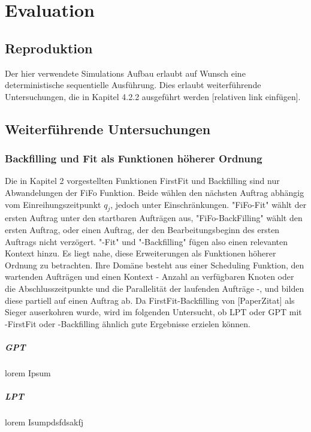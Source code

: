 \chapter{Evaluation}
\label{chap:ein}

\section{Reproduktion}

Der hier verwendete Simulations Aufbau erlaubt auf Wunsch eine deterministische sequentielle Ausführung. Dies erlaubt weiterführende Untersuchungen, die in Kapitel 4.2.2 ausgeführt werden [relativen link einfügen].

\section{Weiterführende Untersuchungen}

\subsection{Backfilling und Fit als Funktionen höherer Ordnung}

Die in Kapitel 2 vorgestellten Funktionen FirstFit und Backfilling sind nur Abwandelungen der FiFo Funktion. Beide wählen den nächsten Auftrag abhängig vom Einreihungszeitpunkt $q_j$, jedoch unter Einschränkungen. "FiFo-Fit" wählt der ersten Auftrag unter den startbaren Aufträgen aus, "FiFo-BackFilling" wählt den ersten Auftrag, oder einen Auftrag, der den Bearbeitungsbeginn des ersten Auftrags nicht verzögert. "-Fit" und "-Backfilling" fügen also einen relevanten Kontext hinzu. Es liegt nahe, diese Erweiterungen als Funktionen höherer Ordnung zu betrachten. Ihre Domäne besteht aus einer Scheduling Funktion, den wartenden Aufträgen und einen Kontext - Anzahl an verfügbaren Knoten oder die Abschlusszeitpunkte und die Parallelität der laufenden Aufträge -, und bilden diese partiell auf einen Auftrag ab. 
Da FirstFit-Backfilling von [PaperZitat] als Sieger auserkohren wurde, wird im folgenden Untersucht, ob LPT oder GPT mit -FirstFit oder -Backfilling ähnlich gute Ergebnisse erzielen können.

\paragraph{GPT}
lorem Ipsum

\paragraph{LPT}
lorem Isumpdsfdsakfj



